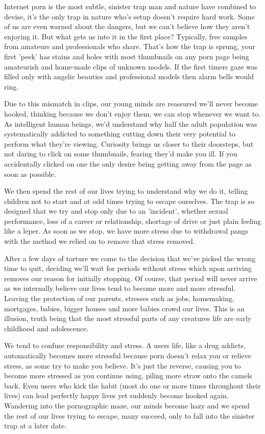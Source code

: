 \documentclass[easypeasy.tex]{subfiles}
\begin{document}
Internet porn is the most subtle, sinister trap man and nature have combined to devise, it's the only trap in nature who's setup doesn't require hard work. Some of us are even warned about the dangers, but we can't believe how they aren't enjoying it. But what gets us into it in the first place? Typically, free samples from amateurs and professionals who share. That's how the trap is sprung, your first 'peek' has stains and holes with most thumbnails on any porn page being amateurish and home-made clips of unknown models. If the first timers gaze was filled only with angelic beauties and professional models then alarm bells would ring.

Due to this mismatch in clips, our young minds are reassured we'll never become hooked, thinking because we don't enjoy them, we can stop whenever we want to. As intelligent human beings, we'd understand why half the adult population was systematically addicted to something cutting down their very potential to perform what they're viewing. Curiosity brings us closer to their doorsteps, but not daring to click on some thumbnails, fearing they'd make you ill. If you accidentally clicked on one the only desire being getting away from the page as soon as possible.

We then spend the rest of our lives trying to understand why we do it, telling children not to start and at odd times trying to escape ourselves. The trap is so designed that we try and stop only due to an 'incident', whether sexual performance, loss of a career or relationship, shortage of drive or just plain feeling like a leper. As soon as we stop, we have more stress due to withdrawal pangs with the method we relied on to remove that stress removed.

After a few days of torture we come to the decision that we've picked the wrong time to quit, deciding we'll wait for periods without stress which upon arriving removes our reason for initially stopping. Of course, that period will never arrive as we internally believe our lives tend to become more and more stressful. Leaving the protection of our parents, stresses such as jobs, homemaking, mortgages, babies, bigger houses and more babies crowd our lives. This is an illusion, truth being that the most stressful parts of any creatures life are early childhood and adolescence.

We tend to confuse responsibility and stress. A users life, like a drug addicts, automatically becomes more stressful because porn doesn't relax you or relieve stress, as some try to make you believe. It's just the reverse, causing you to become more stressed as you continue using, piling more straw onto the camels back. Even users who kick the habit (most do one or more times throughout their lives) can lead perfectly happy lives yet suddenly become hooked again. Wandering into the pornographic maze, our minds become hazy and we spend the rest of our lives trying to escape, many succeed, only to fall into the sinister trap at a later date.
\end{document}
